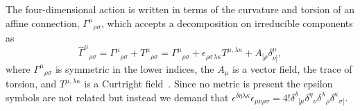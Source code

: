 \documentclass[aps,prl,twocolumn,superscriptaddress,showpacs,showkeys]{revtex4-1}
\begin{document}
The four-dimensional action is written in terms of the curvature and torsion of an affine connection, $\Gamma^\mu{}_{\rho\sigma}$, which accepts a decomposition on irreducible components as
\begin{equation}
  \hat{\Gamma}^\mu{}_{\rho\sigma} = {\Gamma}^\mu{}_{\rho\sigma} + T^\mu{}_{\rho\sigma} = {\Gamma}^\mu{}_{\rho\sigma} + \epsilon_{\rho\sigma\lambda\kappa}T^{\mu,\lambda\kappa}+A_{[\rho}\delta^\mu_{\nu]},
\end{equation}
where ${\Gamma}^\mu{}_{\rho\sigma}$ is symmetric in the lower indices, the $A_\mu$ is a vector field, the trace of torsion, and  $T^{\mu,\lambda\kappa}$ is a Curtright field~\cite{Curtright:1980yk}. Since no metric is present  the epsilon symbols are not related but instead we demand that \mbox{$\epsilon^{\delta\eta\lambda\kappa}\epsilon_{\mu\nu\rho\sigma}=4!\delta^{\delta}{}_{[\mu}\delta^\eta{}_{\nu}\delta^{\lambda}{}_{\rho} \delta^\kappa{}_{\sigma]}$.}
\end{document}
